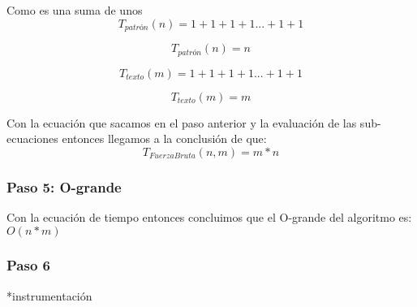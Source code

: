 Como es una suma de unos
\[T_{patrón}(n) = 1 + 1 + 1 + 1 ... + 1 + 1\]

\[T_{patrón}(n) = n \]

\[T_{texto}(m) = 1 + 1 + 1 + 1 ... + 1 + 1\]

\[T_{texto}(m) = m \]

Con la ecuación que sacamos en el paso anterior y la evaluación de las sub-ecuaciones entonces llegamos a la conclusión de que:
\[T_{Fuerza Bruta}(n,m) = m*n\]


\subsubsection*{Paso 5: O-grande}
Con la ecuación de tiempo entonces concluimos que el O-grande del algoritmo es: $O(n*m)$

\subsubsection*{Paso 6}
*instrumentación